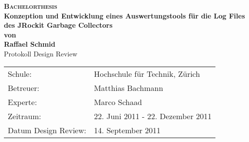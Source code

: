 \begin{titlepage}
\begin{center}
\textsc{\Huge \bf Bachelorthesis}\\[0.4cm]
\LARGE \textbf{Konzeption und Entwicklung eines Auswertungstools für die Log Files des JRockit Garbage Collectors}\\[1.0cm]
\large \textbf{von}\\[0.5cm]
\large \textbf{Raffael Schmid}\\[3cm]
\LARGE Protokoll Design Review\\
\vspace{6cm}

\end{center}

\begin{tabular}[ht]{ll}
  Schule: & Hochschule für Technik, Zürich\\
  Betreuer: & Matthias Bachmann\\
  Experte: & Marco Schaad \\
  Zeitraum: & 22. Juni 2011 - 22. Dezember 2011\\
  Datum Design Review: & 14. September 2011
\end{tabular}
\end{titlepage}
